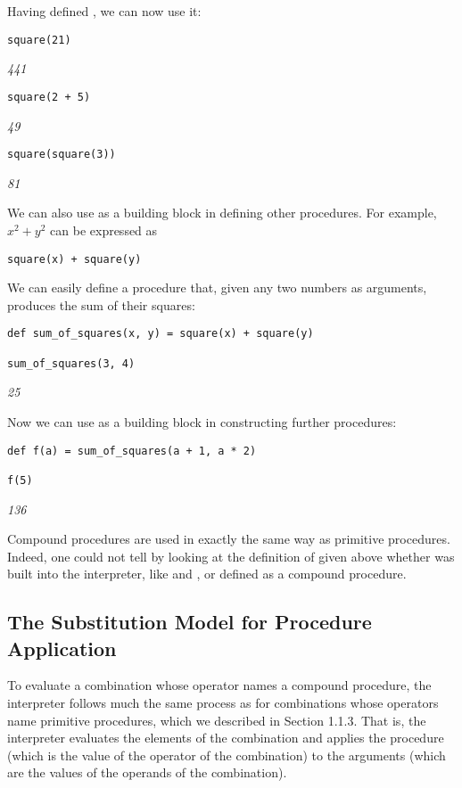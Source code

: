 Having defined , we can now use it:

\begin{lstlisting}
square(21)
\end{lstlisting}
\textit{441}

\begin{lstlisting}
square(2 + 5)
\end{lstlisting}
\textit{49}

\begin{lstlisting}
square(square(3))
\end{lstlisting}
\textit{81}

We can also use  as a building block in defining other procedures. For example, $x^2 + y^2$ can be expressed as

\begin{lstlisting}
square(x) + square(y)
\end{lstlisting}

We can easily define a procedure  that, given any two numbers as arguments, produces the sum of their squares:

\begin{lstlisting}
def sum_of_squares(x, y) = square(x) + square(y)

sum_of_squares(3, 4)
\end{lstlisting}
\textit{25}

Now we can use  as a building block in constructing further procedures:

\begin{lstlisting}
def f(a) = sum_of_squares(a + 1, a * 2)

f(5)
\end{lstlisting}
\textit{136}

Compound procedures are used in exactly the same way as primitive procedures. Indeed, one could not tell by looking at the definition of  given above whether  was built into the interpreter, like \slate{+} and \slate{*}, or defined as a compound procedure.

\subsection{The Substitution Model for Procedure Application}

To evaluate a combination whose operator names a compound procedure, the interpreter follows much the same process as for combinations whose operators name primitive procedures, which we described in Section 1.1.3. That is, the interpreter evaluates the elements of the combination and applies the procedure (which is the value of the operator of the combination) to the arguments (which are the values of the operands of the combination).


